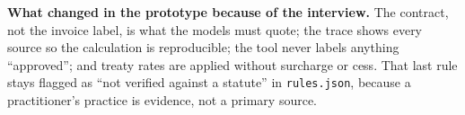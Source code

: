 \documentclass[10pt,a4paper]{article}
\begin{document}
\vspace{6pt}
\begin{keybox}
\textbf{What changed in the prototype because of the interview.} The contract, not the invoice label, is what the models must quote; the trace shows every source so the calculation is reproducible; the tool never labels anything ``approved''; and treaty rates are applied without surcharge or cess. That last rule stays flagged as ``not verified against a statute'' in \texttt{rules.json}, because a practitioner's practice is evidence, not a primary source.
\end{keybox}
\end{document}
